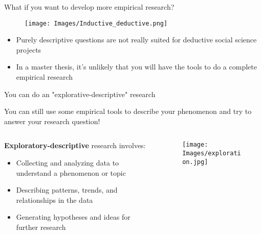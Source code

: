 \documentclass[10pt, aspectratio=169]{beamer}
\begin{document}
\begin{frame}{What if you want to develop more empirical research?}
    \begin{figure}
        \centering
        \texttt{[image: Images/Inductive\_deductive.png]}
        \label{fig:enter-label}
    \end{figure}
\begin{itemize}
    \item Purely descriptive questions are not really suited for deductive social science projects
    \item In a master thesis, it's unlikely that you will have the tools to do a complete empirical research
\end{itemize}
\end{frame}

\begin{frame}{You can do an "explorative-descriptive" research}
\begin{center}
You can still use some empirical tools to describe your phenomenon and try to answer your research question! \vspace{0.3cm}
\end{center}
\begin{columns}
    \begin{column}{0.5\textwidth}
\textbf{Exploratory-descriptive} research involves: \vspace{0.1cm}
\begin{itemize}
    \item Collecting and analyzing data to understand a phenomenon or topic \vspace{0.3cm}
    \item Describing patterns, trends, and relationships in the data \vspace{0.3cm}
    \item Generating hypotheses and ideas for further research \vspace{0.3cm}
\end{itemize}
\end{column}
\begin{column}{0.5\textwidth}
\begin{figure}
    \centering
    \texttt{[image: Images/exploration.jpg]}
    \label{fig:enter-label}
\end{figure}
\end{column}
\end{columns}
\end{frame}
\end{document}
